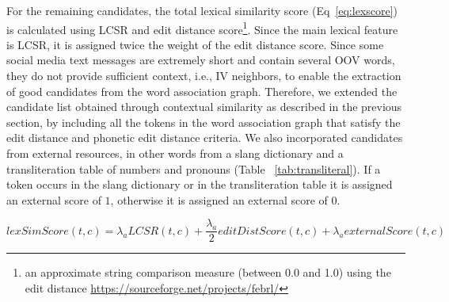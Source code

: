 \documentclass[a4paper,onesided,12pt]{report}
\begin{document}
For the remaining candidates, the total lexical similarity score (Eq~\ref{eq:lexscore}) is calculated using LCSR and edit distance score\footnote{an approximate string comparison measure (between 0.0 and 1.0) using the edit distance \url{https://sourceforge.net/projects/febrl/}}. Since the main lexical feature is LCSR, it is assigned twice the weight of the edit distance score. Since some social media text messages are extremely short and contain several OOV words, they do not provide sufficient context, i.e., IV neighbors, to enable the extraction of good candidates from the word association graph. Therefore, we extended the candidate list obtained through contextual similarity as described in the previous section, by including all the tokens in the word association graph that satisfy the edit distance and phonetic edit distance criteria. We also incorporated candidates from external resources, in other words from a slang dictionary and a transliteration table of numbers and pronouns (Table ~\ref{tab:transliteral}). If a token occurs in the slang dictionary or in the transliteration table it is assigned an external score of $1$, otherwise it is assigned an external score of $0$.

\begin{equation}
lexSimScore(t,c) = \lambda_a LCSR(t,c) + \frac{\lambda_a} 2 editDistScore(t,c) + \lambda_a externalScore(t,c)
\label{eq:lexscore}
\end{equation}
\end{document}
